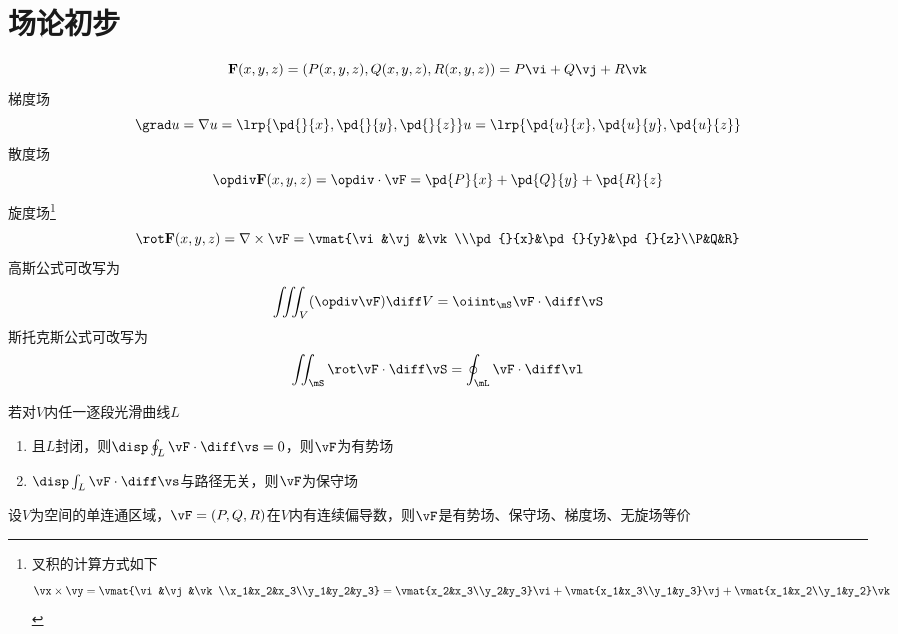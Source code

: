 
\section{场论初步}
\label{sec:field}
\[\mathbf{F}(x,y,z)=(P(x,y,z),Q(x,y,z),R(x,y,z))=P\vi+Q\vj+R\vk\]
梯度场
\[\grad u=\nabla u=\lrp{\pd{}{x},\pd{}{y},\pd{}{z}}u=\lrp{\pd{u}{x},\pd{u}{y},\pd{u}{z}}\]
散度场
\[\opdiv \mathbf{F}(x,y,z)=\opdiv\cdot\vF=\pd{P}{x}+\pd{Q}{y}+\pd{R}{z}\]
旋度场\footnote{叉积的计算方式如下
\[\vx\times\vy=\vmat{\vi&\vj&\vk\\x_1&x_2&x_3\\y_1&y_2&y_3}=\vmat{x_2&x_3\\y_2&y_3}\vi+\vmat{x_1&x_3\\y_1&y_3}\vj+\vmat{x_1&x_2\\y_1&y_2}\vk\]}
\[\rot \mathbf{F}(x,y,z)=\nabla\times\vF=\vmat{\vi&\vj&\vk\\\pd{}{x}&\pd{}{y}&\pd{}{z}\\P&Q&R}\]
高斯公式可改写为
\[\iiint_V(\opdiv\vF)\diff V=\oiint_\mS\vF\cdot\diff\vS\]
斯托克斯公式可改写为
\[\iint_\mS\rot\vF\cdot\diff\vS=\oint_\mL\vF\cdot\diff\vl\]
\begin{definition}
若对$V$内任一逐段光滑曲线$L$
\begin{enumerate}
	\item 且$L$封闭，则$\disp\oint_L\vF\cdot\diff\vs=0$，则$\vF$为有势场
	\item $\disp\int_L\vF\cdot\diff\vs$与路径无关，则$\vF$为保守场
\end{enumerate}
\end{definition}
\begin{theorem}
设$V$为空间的单连通区域，$\vF=(P,Q,R)$在$V$内有连续偏导数，则$\vF$是有势场、保守场、梯度场、无旋场等价
\end{theorem}